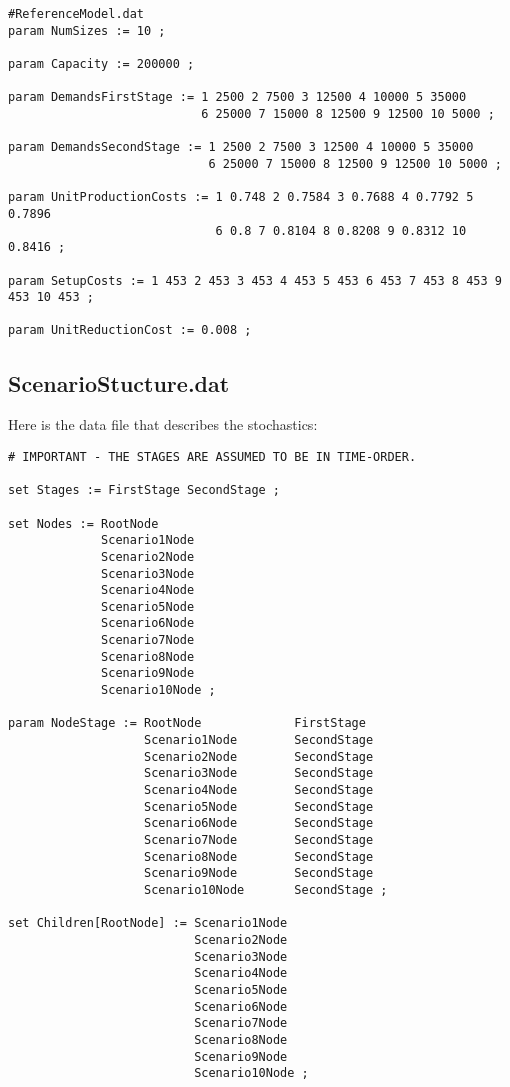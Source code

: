 {\small
\begin{verbatim}
#ReferenceModel.dat
param NumSizes := 10 ;

param Capacity := 200000 ;

param DemandsFirstStage := 1 2500 2 7500 3 12500 4 10000 5 35000
                           6 25000 7 15000 8 12500 9 12500 10 5000 ;

param DemandsSecondStage := 1 2500 2 7500 3 12500 4 10000 5 35000
                            6 25000 7 15000 8 12500 9 12500 10 5000 ;

param UnitProductionCosts := 1 0.748 2 0.7584 3 0.7688 4 0.7792 5 0.7896
                             6 0.8 7 0.8104 8 0.8208 9 0.8312 10 0.8416 ;

param SetupCosts := 1 453 2 453 3 453 4 453 5 453 6 453 7 453 8 453 9 453 10 453 ;

param UnitReductionCost := 0.008 ;
\end{verbatim}

\subsection{ScenarioStucture.dat}

Here is the data file that describes the stochastics:

\begin{verbatim}
# IMPORTANT - THE STAGES ARE ASSUMED TO BE IN TIME-ORDER.

set Stages := FirstStage SecondStage ;

set Nodes := RootNode 
             Scenario1Node
             Scenario2Node
             Scenario3Node
             Scenario4Node
             Scenario5Node
             Scenario6Node
             Scenario7Node
             Scenario8Node
             Scenario9Node
             Scenario10Node ;

param NodeStage := RootNode             FirstStage 
                   Scenario1Node        SecondStage
                   Scenario2Node        SecondStage
                   Scenario3Node        SecondStage
                   Scenario4Node        SecondStage
                   Scenario5Node        SecondStage
                   Scenario6Node        SecondStage
                   Scenario7Node        SecondStage
                   Scenario8Node        SecondStage
                   Scenario9Node        SecondStage
                   Scenario10Node       SecondStage ;

set Children[RootNode] := Scenario1Node
                          Scenario2Node
                          Scenario3Node
                          Scenario4Node
                          Scenario5Node
                          Scenario6Node
                          Scenario7Node
                          Scenario8Node
                          Scenario9Node
                          Scenario10Node ;


\end{verbatim}}
